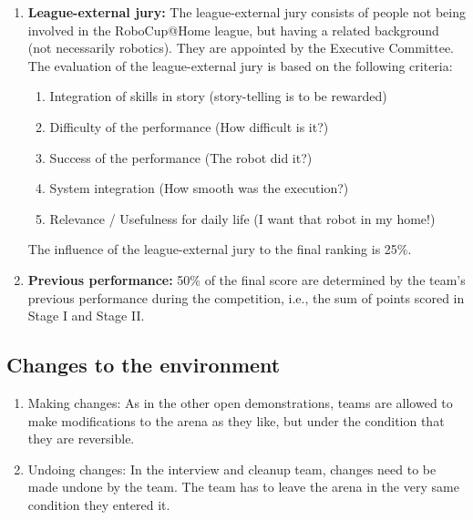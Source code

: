 \begin{enumerate}
  \item \textbf{League-external jury:} The league-external jury consists of people not being involved in the RoboCup@Home league, but having a related background (not necessarily robotics). They are appointed by the Executive Committee. The evaluation of the league-external jury is based on the following criteria:
  \begin{enumerate}
    \item Integration of skills in story (story-telling is to be rewarded)
    \item Difficulty of the performance (How difficult is it?)
    \item Success of the performance (The robot did it?)
    \item System integration (How smooth was the execution?)
    \item Relevance / Usefulness for daily life (I want that robot in my home!)
  \end{enumerate}

  The influence of the league-external jury to the final ranking is 25\%. \\

  \item \textbf{Previous performance:} 50\% of the final score are determined by the team's previous performance during the competition, i.e., the sum of points scored in Stage I and Stage II.
\end{enumerate}

\subsection{Changes to the environment}
\begin{enumerate}
  \item Making changes: As in the other open demonstrations, teams are allowed to make modifications to the arena as they like, but under the condition that they are reversible.
  \item Undoing changes: In the interview and cleanup team, changes need to be made undone by the team. The team has to leave the arena in the very same condition they entered it.
\end{enumerate}

